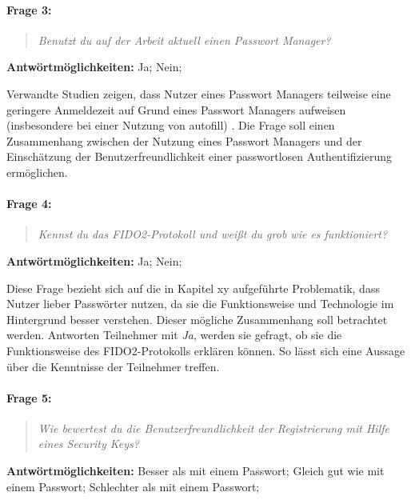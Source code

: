 \paragraph{Frage 3:}

\begin{quote}
    \textit{Benutzt du auf der Arbeit aktuell einen Passwort Manager?}
\end{quote}

\textbf{Antwörtmöglichkeiten:} Ja; Nein;

Verwandte Studien zeigen, dass Nutzer eines Passwort Managers teilweise eine geringere Anmeldezeit auf Grund eines Passwort Managers aufweisen (insbesondere bei einer Nutzung von autofill) \cite{farke2020you}. Die Frage soll einen Zusammenhang zwischen der Nutzung eines Passwort Managers und der Einschätzung der Benutzerfreundlichkeit einer passwortlosen Authentifizierung ermöglichen.

\paragraph{Frage 4:}

\begin{quote}
    \textit{Kennst du das FIDO2-Protokoll und weißt du grob wie es funktioniert?}
\end{quote}

\textbf{Antwörtmöglichkeiten:} Ja; Nein;

Diese Frage bezieht sich auf die in Kapitel xy aufgeführte Problematik, dass Nutzer lieber Passwörter nutzen, da sie die Funktionsweise und Technologie im Hintergrund besser verstehen. Dieser mögliche Zusammenhang soll betrachtet werden. Antworten Teilnehmer mit \textit{Ja}, werden sie gefragt, ob sie die Funktionsweise des FIDO2-Protokolls erklären können. So lässt sich eine Aussage über die Kenntnisse der Teilnehmer treffen. 

\paragraph{Frage 5:}

\begin{quote}
    \textit{Wie bewertest du die Benutzerfreundlichkeit der Registrierung mit Hilfe eines Security Keys?}
\end{quote}

\textbf{Antwörtmöglichkeiten:} Besser als mit einem Passwort; Gleich gut wie mit einem Passwort; Schlechter als mit einem Passwort;

